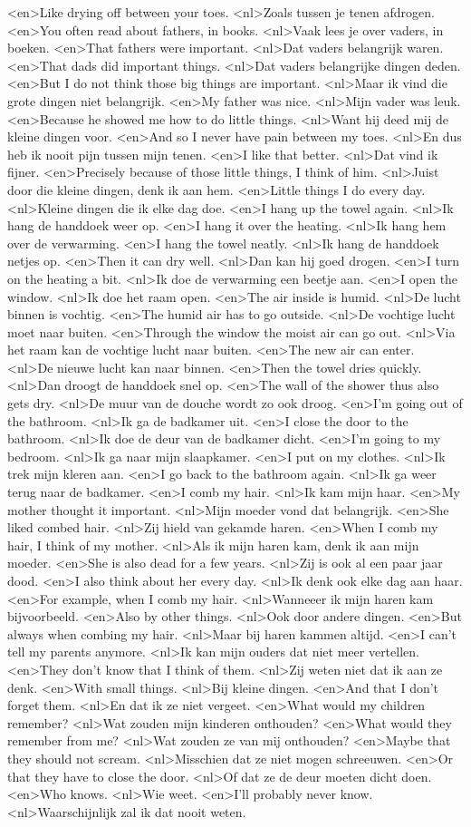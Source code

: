 <en>Like drying off between your toes.
<nl>Zoals tussen je tenen afdrogen.
<en>You often read about fathers, in books.
<nl>Vaak lees je over vaders, in boeken.
<en>That fathers were important.
<nl>Dat vaders belangrijk waren.
<en>That dads did important things.
<nl>Dat vaders belangrijke dingen deden.
<en>But I do not think those big things are important.
<nl>Maar ik vind die grote dingen niet belangrijk.
<en>My father was nice.
<nl>Mijn vader was leuk.
<en>Because he showed  me how to do little things.
<nl>Want hij deed mij de kleine dingen voor.
<en>And so I never have pain between my toes.
<nl>En dus heb ik nooit pijn tussen mijn tenen.
<en>I like that better.
<nl>Dat vind ik fijner.
<en>Precisely because of those little things, I think of him.
<nl>Juist door die kleine dingen, denk ik aan hem.
<en>Little things I do every day.
<nl>Kleine dingen die ik elke dag doe.
<en>I hang up the towel again.
<nl>Ik hang de handdoek weer op.
<en>I hang it over the heating.
<nl>Ik hang hem over de verwarming.
<en>I hang the towel neatly.
<nl>Ik hang de handdoek netjes op.
<en>Then it can dry well.
<nl>Dan kan hij goed drogen.
<en>I turn on the heating a bit.
<nl>Ik doe de verwarming een beetje aan.
<en>I open the window.
<nl>Ik doe het raam open.
<en>The air inside is humid.
<nl>De lucht binnen is vochtig.
<en>The humid air has to go outside.
<nl>De vochtige lucht moet naar buiten.
<en>Through the window the moist air can go out.
<nl>Via het raam kan de vochtige lucht naar buiten.
<en>The new air can enter.
<nl>De nieuwe lucht kan naar binnen.
<en>Then the towel dries quickly.
<nl>Dan droogt de handdoek snel op.
<en>The wall of the shower  thus also gets dry.
<nl>De muur van de douche wordt zo ook droog.
<en>I'm going out of the bathroom.
<nl>Ik ga de badkamer uit.
<en>I close the door to the bathroom.
<nl>Ik doe de deur van de badkamer dicht.
<en>I'm going to my bedroom.
<nl>Ik ga naar mijn slaapkamer.
<en>I put on my clothes.
<nl>Ik trek mijn kleren aan.
<en>I go back to the bathroom again.
<nl>Ik ga weer terug naar de badkamer.
<en>I comb my hair.
<nl>Ik kam mijn haar.
<en>My mother thought it important.
<nl>Mijn moeder vond dat belangrijk.
<en>She liked combed hair.
<nl>Zij hield van gekamde haren.
<en>When I comb my hair, I think of my mother.
<nl>Als ik mijn haren kam, denk ik aan mijn moeder.
<en>She is also dead for a few years.
<nl>Zij is ook al een paar jaar dood.
<en>I also think about her every day.
<nl>Ik denk ook elke dag aan haar.
<en>For example, when I comb my hair.
<nl>Wanneeer ik mijn haren kam bijvoorbeeld.
<en>Also by other things.
<nl>Ook door andere dingen.
<en>But always when combing my hair.
<nl>Maar bij haren kammen altijd.
<en>I can't tell my parents anymore.
<nl>Ik kan mijn ouders dat niet meer vertellen.
<en>They don't know that I think of them.
<nl>Zij weten niet dat ik aan ze denk.
<en>With small things.
<nl>Bij kleine dingen.
<en>And that I don't forget them.
<nl>En dat ik ze niet vergeet.
<en>What would my children remember?
<nl>Wat zouden mijn kinderen onthouden?
<en>What would they remember from me?
<nl>Wat zouden ze van mij onthouden?
<en>Maybe that they should not scream.
<nl>Misschien dat ze niet mogen schreeuwen.
<en>Or that they have to close the door.
<nl>Of dat ze de deur moeten dicht doen.
<en>Who knows.
<nl>Wie weet.
<en>I'll probably never know.
<nl>Waarschijnlijk zal ik dat nooit weten.
